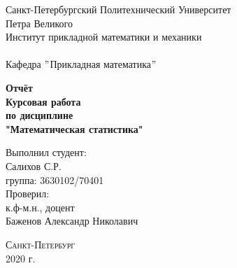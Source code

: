 \documentclass[a4]{article}
\begin{document}
	\def\contentsname{\LARGE{Содержание}}
	\thispagestyle{empty}
	\begin{center} 
		\vspace{2cm} 
		{\Large \sc Санкт-Петербургский Политехнический Университет}\\
		\vspace{2mm}
		{\Large\sc Петра Великого}\\
		\vspace{1cm}
		{\large \sc Институт прикладной математики и механики\\ 
			\vspace{0.5mm}
			\textsc{}}\\ 
		\vspace{0.5mm}
		{\large\sc Кафедра $"$Прикладная математика$"$}\\
		\vspace{15mm}
		
		
		{\sc \textbf{Отчёт\\
			Курсовая работа\\
			по дисциплине\\
			"Математическая статистика"}
			\vspace{6mm}
			
		}
		\vspace*{2mm}
		
		
		\begin{flushleft}
			\vspace{4cm}
			\sc Выполнил студент:\\
			\sc Салихов С.Р.\\
			\sc группа: 3630102/70401\\
			\vspace{1cm}
			\sc Проверил:\\
			\sc к.ф-м.н., доцент\\
			\sc Баженов Александр Николавич
			\vspace{20mm}
		\end{flushleft}
	\end{center} 
	\begin{center}
		\vfill {\large\textsc{Санкт-Петербург}}\\ 
		2020 г.
	\end{center}
	
	\newpage
	\pagestyle{plain}
	
	
	
\end{document}
